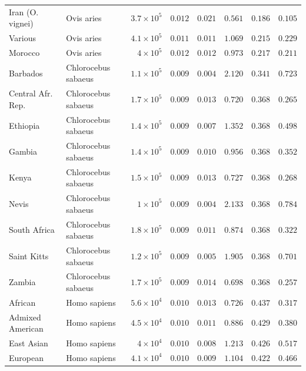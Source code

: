 \documentclass{article}
\begin{document}
\begin{center}
\begin{longtable*}{|l|l|r|r|r|r|r|r|}
            Iran (O. vignei) & Ovis aries & $3.7\times 10^{5}$ & $ 0.012$ & $ 0.021$ & $ 0.561$ & $ 0.186$ & $ 0.105$ \\
            Various & Ovis aries & $4.1\times 10^{5}$ & $ 0.011$ & $ 0.011$ & $ 1.069$ & $ 0.215$ & $ 0.229$ \\
            Morocco & Ovis aries & $ 4\times 10^{5}$ & $ 0.012$ & $ 0.012$ & $ 0.973$ & $ 0.217$ & $ 0.211$ \\
             Barbados & Chlorocebus sabaeus & $1.1\times 10^{5}$ & $ 0.009$ & $ 0.004$ & $ 2.120$ & $ 0.341$ & $ 0.723$ \\
             Central Afr. Rep. & Chlorocebus sabaeus & $1.7\times 10^{5}$ & $ 0.009$ & $ 0.013$ & $ 0.720$ & $ 0.368$ & $ 0.265$ \\
             Ethiopia & Chlorocebus sabaeus & $1.4\times 10^{5}$ & $ 0.009$ & $ 0.007$ & $ 1.352$ & $ 0.368$ & $ 0.498$ \\
             Gambia & Chlorocebus sabaeus & $1.4\times 10^{5}$ & $ 0.009$ & $ 0.010$ & $ 0.956$ & $ 0.368$ & $ 0.352$ \\
             Kenya & Chlorocebus sabaeus & $1.5\times 10^{5}$ & $ 0.009$ & $ 0.013$ & $ 0.727$ & $ 0.368$ & $ 0.268$ \\
             Nevis & Chlorocebus sabaeus & $ 1\times 10^{5}$ & $ 0.009$ & $ 0.004$ & $ 2.133$ & $ 0.368$ & $ 0.784$ \\
             South Africa & Chlorocebus sabaeus & $1.8\times 10^{5}$ & $ 0.009$ & $ 0.011$ & $ 0.874$ & $ 0.368$ & $ 0.322$ \\
             Saint Kitts & Chlorocebus sabaeus & $1.2\times 10^{5}$ & $ 0.009$ & $ 0.005$ & $ 1.905$ & $ 0.368$ & $ 0.701$ \\
             Zambia & Chlorocebus sabaeus & $1.7\times 10^{5}$ & $ 0.009$ & $ 0.014$ & $ 0.698$ & $ 0.368$ & $ 0.257$ \\
            African & Homo sapiens & $5.6\times 10^{4}$ & $ 0.010$ & $ 0.013$ & $ 0.726$ & $ 0.437$ & $ 0.317$ \\
            Admixed American & Homo sapiens & $4.5\times 10^{4}$ & $ 0.010$ & $ 0.011$ & $ 0.886$ & $ 0.429$ & $ 0.380$ \\
            East Asian & Homo sapiens & $ 4\times 10^{4}$ & $ 0.010$ & $ 0.008$ & $ 1.213$ & $ 0.426$ & $ 0.517$ \\
            European & Homo sapiens & $4.1\times 10^{4}$ & $ 0.010$ & $ 0.009$ & $ 1.104$ & $ 0.422$ & $ 0.466$ \\

\end{longtable*}
\end{center}
\end{document}
